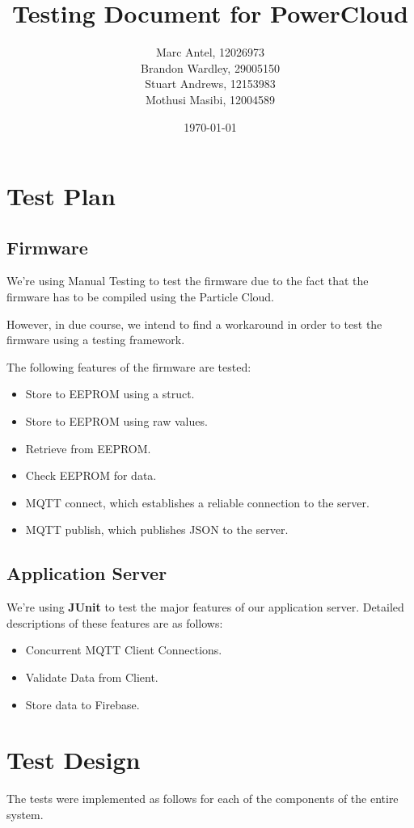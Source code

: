 \documentclass[a4paper,10pt]{article}
\title{Testing Document for PowerCloud}
\author{Marc Antel, 12026973\\ Brandon Wardley, 29005150\\ Stuart Andrews, 12153983\\ Mothusi Masibi, 12004589}
\date{\today}
\begin{document}
	\maketitle
	\newpage
	\section{Test Plan}
		\subsection{Firmware}
			We're using Manual Testing to test the firmware due to the fact that the firmware has to be compiled using the Particle Cloud.
			
			However, in due course, we intend to find a workaround in order to test the firmware using a testing framework.
			
			The following features of the firmware are tested:
			\begin{itemize}
				\item Store to EEPROM using a struct.
				\item Store to EEPROM using raw values.
				\item Retrieve from EEPROM.
				\item Check EEPROM for data.
				\item MQTT connect, which establishes a reliable connection to the server.
				\item MQTT publish, which publishes JSON to the server.
			\end{itemize}
			
		\subsection{Application Server}
			We're using \textbf{JUnit} to test the major features of our application server.
			Detailed descriptions of these features are as follows:
				\begin{itemize}
					\item Concurrent MQTT Client Connections.
					\item Validate Data from Client.
					\item Store data to Firebase.
				\end{itemize}
				
	\section{Test Design}
	The tests were implemented as follows for each of the components of the entire system.
\end{document}
